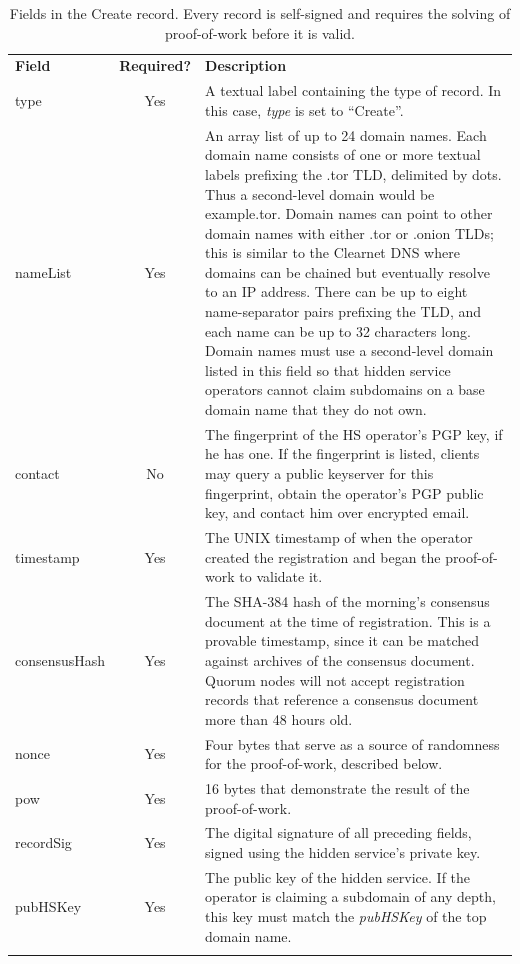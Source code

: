 \renewcommand{\arraystretch}{1.75} %
\begin{center}
    \begin{longtabu}{ | l | c | p{9.5cm} |}
    \hline
    \textbf{Field} & \textbf{Required?} & \textbf{Description} \\
    type & Yes & A textual label containing the type of record. In this case, \emph{type} is set to ``Create''. \\
    nameList & Yes & An array list of up to 24 domain names. Each domain name consists of one or more textual labels prefixing the .tor TLD, delimited by dots. Thus a second-level domain would be example.tor. Domain names can point to other domain names with either .tor or .onion TLDs; this is similar to the Clearnet DNS where domains can be chained but eventually resolve to an IP address. There can be up to eight name-separator pairs prefixing the TLD, and each name can be up to 32 characters long. Domain names must use a second-level domain listed in this field so that hidden service operators cannot claim subdomains on a base domain name that they do not own. \\
    contact & No & The fingerprint of the HS operator's PGP key, if he has one. If the fingerprint is listed, clients may query a public keyserver for this fingerprint, obtain the operator's PGP public key, and contact him over encrypted email. \\
	timestamp & Yes & The UNIX timestamp of when the operator created the registration and began the proof-of-work to validate it. \\
	consensusHash & Yes & The SHA-384 hash of the morning's consensus document at the time of registration. This is a provable timestamp, since it can be matched against archives of the consensus document. Quorum nodes will not accept registration records that reference a consensus document more than 48 hours old. \\
	nonce & Yes & Four bytes that serve as a source of randomness for the proof-of-work, described below. \\
    pow & Yes & 16 bytes that demonstrate the result of the proof-of-work. \\
    recordSig & Yes & The digital signature of all preceding fields, signed using the hidden service's private key. \\
    pubHSKey & Yes & The public key of the hidden service. If the operator is claiming a subdomain of any depth, this key must match the \emph{pubHSKey} of the top domain name.\\
    \hline
    \caption{Fields in the Create record. Every record is self-signed and requires the solving of proof-of-work before it is valid.}
    \end{longtabu}
	\label{table:createTable}
\end{center}

